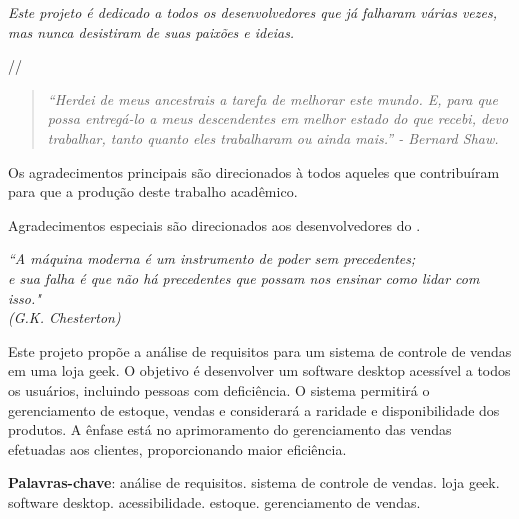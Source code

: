 \documentclass[
	12pt,				%
	openright,			%
	twoside,			%
	a4paper,			%
	english,			%
	brazil				%
	]{abntex2}
\begin{document}
\begin{dedicatoria}
	\vspace*{\fill}
	\centering
	\noindent
	\textit{Este projeto é dedicado a todos os desenvolvedores que já falharam várias vezes, mas nunca desistiram de suas paixões e ideias.}
 
	//
 
	\begin{quote}
	 \textit{``Herdei de meus ancestrais a tarefa de melhorar este mundo. E, para que possa entregá-lo a meus descendentes em melhor estado do que recebi, devo trabalhar, tanto quanto eles trabalharam ou ainda mais.'' - Bernard Shaw.}
	\end{quote}
 
	\vspace*{\fill}
 
 \end{dedicatoria}
 

\begin{agradecimentos}
	Os agradecimentos principais são direcionados à todos aqueles que contribuíram para que a produção deste trabalho acadêmico.
	
	Agradecimentos especiais são direcionados aos desenvolvedores do \abnTeX.
	
	\end{agradecimentos}

\begin{epigrafe}
	\vspace*{\fill}
	\begin{flushright}
		\textit{``A máquina moderna é um instrumento de poder sem precedentes;\\ e sua falha é que não há precedentes que possam nos ensinar como lidar com isso." \\
		(G.K. Chesterton)}
	\end{flushright}
\end{epigrafe}



\setlength{\absparsep}{18pt} %
\begin{resumo}
	Este projeto propõe a análise de requisitos para um sistema de controle de vendas em uma loja geek. O objetivo é desenvolver um software desktop acessível a todos os usuários, incluindo pessoas com deficiência. O sistema permitirá o gerenciamento de estoque, vendas e considerará a raridade e disponibilidade dos produtos. A ênfase está no aprimoramento do gerenciamento das vendas efetuadas aos clientes, proporcionando maior eficiência.

 \textbf{Palavras-chave}: análise de requisitos. sistema de controle de vendas. loja geek. software desktop. acessibilidade. estoque. gerenciamento de vendas.
\end{resumo}
\end{document}
